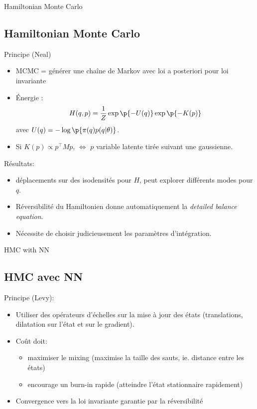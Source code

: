 \documentclass{beamer}
\begin{document}
\begin{frame}{Hamiltonian Monte Carlo}
\subsection{Hamiltonian Monte Carlo}
Principe (Neal) 
\begin{itemize}
\item MCMC = générer une chaîne de Markov avec loi a posteriori pour loi invariante 
\item Énergie : 
\begin{equation*}
H(q, p) = \frac{1}{Z} \exp{\p{-U(q)}} \exp{\p{-K(p)}}
\end{equation*}
avec $U(q) = - \log\p{\pi(q) p(q | \theta)}$. 
\item Si $K(p) \varpropto p^\top M p$, $\iff$ $p$ variable latente tirée suivant une gaussienne. 
\end{itemize}

Résultats: 
\begin{itemize}
\item déplacements sur des isodensités pour $H$, peut explorer différents modes pour $q$.
\item Réversibilité du Hamiltonien donne automatiquement la \textit{detailed balance equation}.
\item Nécessite de choisir judicieusement les paramètres d'intégration. 
\end{itemize}
\end{frame}

\begin{frame}{HMC with NN}
\subsection{HMC avec NN}
Principe (Levy): 
\begin{itemize}
\item Utiliser des opérateurs d'échelles sur la mise à jour des états (translations, dilatation sur l'état et sur le gradient).
\item Coût doit:
\begin{itemize}
\item maximiser le mixing (maximise la taille des sauts, ie. distance entre les états) 
\item encourage un burn-in rapide (atteindre l'état stationnaire rapidement)
\end{itemize}
\item Convergence vers la loi invariante garantie par la réversibilité
\end{itemize}
\end{frame}
\end{document}
